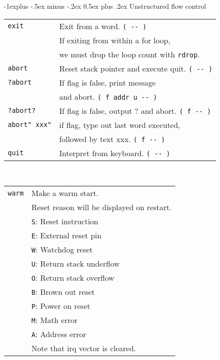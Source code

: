 \documentclass[10pt,landscape,a4paper]{article}
\makeatletter
\renewcommand{\subsection}{\@startsection{subsection}{2}{0mm}%
                                {-1explus -.5ex minus -.2ex}%
                                {0.5ex plus .2ex}%
                                {\normalfont\normalsize\bfseries}}
\newcommand{\compileonly}{\color{blue}}
\makeatother
\begin{document}
\begin{multicols}{3}
\subsection{Unstructured flow control}
\begin{tabular}{@{}ll@{}}
\verb!exit!  & Exit from a word. \verb!( -- )! \\
             & If exiting from within a for loop, \\
             & we must drop the loop count with \verb!rdrop!. \\
\verb!abort! & Reset stack pointer and execute quit. \verb!( -- )! \\
\verb!?abort!  & If flag is false, print message \\
               & and abort. \verb!( f addr u -- )! \\
\verb!?abort?!  & If flag is false, output ? and abort. \verb!( f -- )! \\
{\compileonly\verb!abort"!}\verb! xxx"!  & if flag, type out last word executed, \\
		    & followed by text xxx. \verb!( f -- )! \\
\verb!quit!  & Interpret from keyboard. \verb!( -- )! \\
\end{tabular}\\
\begin{tabular}{@{}ll@{}}
\verb!warm!  & Make a warm start. \\
             & Reset reason will be displayed on restart.\\
             & \verb!S!: Reset instruction\\
             & \verb!E!: External reset pin\\
             & \verb!W!: Watchdog reset\\
             & \verb!U!: Return stack underflow\\
             & \verb!O!: Return stack overflow\\
             & \verb!B!: Brown out reset\\
             & \verb!P!: Power on reset\\
             & \verb!M!: Math error\\
             & \verb!A!: Address error\\ 
             & Note that irq vector is cleared. \\
\end{tabular}

\medskip


\end{multicols}
\end{document}
